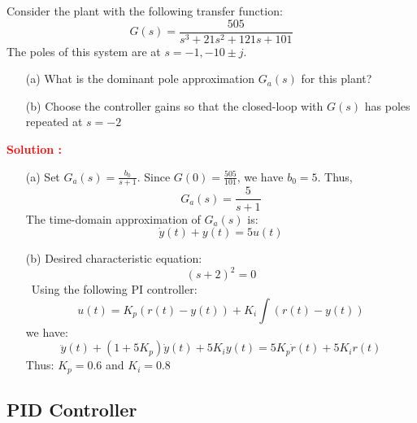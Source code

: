 \documentclass[12pt]{article}
\begin{document}
Consider the plant with the following transfer function:
\begin{equation}
    G(s) = \frac{505}{s^3+21s^2+121s+101}
\end{equation}
The poles of this system are at \(s = -1, -10 \pm j\).
\begin{itemize}
    \item[(a)] What is the dominant pole approximation \(G_a(s)\) for this plant?
    \item[(b)] Choose the controller gains so that the closed-loop with \(G(s)\) has poles repeated at \(s = -2\)
\end{itemize}
\textbf{\textcolor{red}{Solution :}} 
\begin{itemize}
    \item[(a)] Set \(G_a(s) = \frac{b_0}{s+1}\). Since \(G(0) = \frac{505}{101}\), we have \(b_0 = 5\). Thus,
\begin{equation}
    G_a(s) = \frac{5}{s+1}
\end{equation}
The time-domain approximation of \(G_a(s)\) is:
\begin{equation}
    \dot{y}(t) + y(t) = 5 u(t)
\end{equation}
\item[(b)]  Desired characteristic equation:
    \[ (s+2)^2 = 0\]\
    Using the following PI controller:
    \[u(t) = K_p (r(t)-y(t)) + K_i \int (r(t)-y(t))\]
    we have:
    \[\ddot{y}(t) + (1+5K_p)\dot{y}(t) + 5K_i y(t) = 5K_p \dot{r}(t) + 5K_i r(t)\]
    Thus:
    \(K_p = 0.6\) and \(K_i = 0.8\)
\end{itemize}

\clearpage
\subsection{PID Controller}
\end{document}
